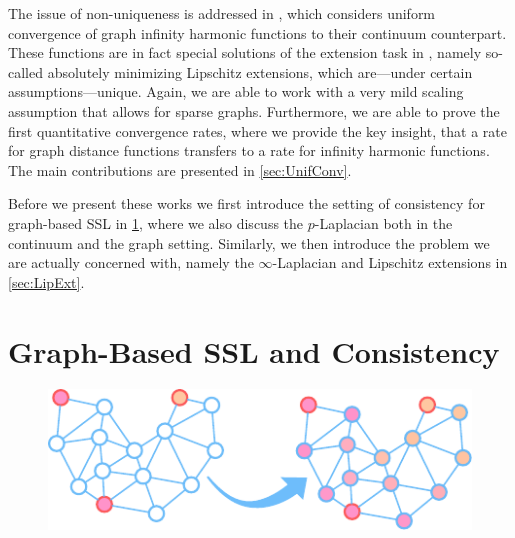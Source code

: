 The issue of non-uniqueness is addressed in \cite{bungert2021uniform}, which considers uniform convergence of graph infinity harmonic functions to their continuum counterpart. These functions are in fact special solutions of the extension task  in \cite{roith2022continuum}, namely so-called absolutely minimizing Lipschitz extensions, which are---under certain assumptions---unique. Again, we are able to work with a very mild scaling assumption that allows for sparse graphs. Furthermore, we are able to prove the first quantitative convergence rates, where we provide the key insight, that a rate for graph distance functions transfers to a rate for infinity harmonic functions. The main contributions are presented in \cref{sec:UnifConv}.


Before we present these works we first introduce the setting of consistency for graph-based SSL in \cref{sec:GSSL}, where we also discuss the $p$-Laplacian both in the continuum and the graph setting. Similarly, we then introduce the problem we are actually concerned with, namely the $\infty$-Laplacian and Lipschitz extensions in \cref{sec:LipExt}.
%
%
%
%
%
\section{Graph-Based SSL and Consistency}\label{sec:GSSL}

\begin{figure}
\centering
\includegraphics[width=.5\textwidth]{atelier/paradigms/GSSL.pdf}
\end{figure}

